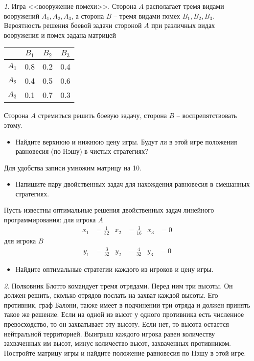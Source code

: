 \documentclass[12pt]{article}
\theoremstyle{remark}
\newtheorem{exercise}{}[subsection]
\begin{document}
\begin{exercise}
Игра <<вооружение помехи>>. Сторона $A$ располагает тремя видами вооружений
$A_1,A_2,A_3$, а сторона $B$ -- тремя видами помех $B_1,B_2,B_3$. Вероятность решения
боевой задачи стороной $A$ при различных видах вооружения и помех задана матрицей
\begin{center}
	\begin{tabular}{|c|c|c|c|}\hline
	& $B_1$ & $B_2$ & $B_3$ \\ \hline
	$A_1$ & 0.8 & 0.2 & 0.4 \\ \hline
	$A_2$ & 0.4 & 0.5 & 0.6 \\ \hline
	$A_3$ & 0.1 & 0.7 & 0.3 \\ \hline
	\end{tabular}
\end{center}
Сторона $A$ стремиться решить боевую задачу, сторона $B$ -- воспрепятствовать этому.
\begin{itemize}
	\item Найдите верхнюю и нижнюю цену игры. Будут ли в этой игре положения равновесия
	(по Нэшу) в чистых стратегиях?
\end{itemize}
Для удобства записи умножим матрицу на 10.
\begin{itemize}
	\item Напишите пару двойственных задач для нахождения равновесия в смешанных стратегиях.
\end{itemize}
Пусть известны оптимальные решения двойственных задач линейного программирования:
для игрока $A$
\begin{align*}
	x_1&=\frac{1}{32} & x_2&=\frac{3}{16} & x_3&=0
\end{align*}
для игрока $B$
\begin{align*}
	y_1&=\frac{3}{32} & y_2&=\frac{4}{32} & y_3&=0
\end{align*}
\begin{itemize}
	\item Найдите оптимальные стратегии каждого из игроков и цену игры.
\end{itemize}
\end{exercise}

\begin{exercise}
Полковник Блотто командует тремя отрядами. Перед ним три высоты.
Он должен решить, сколько отрядов послать на захват каждой высоты.
Его противник, граф Балони, также имеет в подчинении три отряда и должен принять такое же решение. 
Если на одной из высот у одного противника есть численное превосходство, то он захватывает эту высоту. 
Если нет, то высота остается нейтральной территорией. 
Выигрыш каждого игрока равен количеству захваченных им высот, 
минус количество высот, захваченных противником. 
Постройте матрицу игры и найдите положение равновесия по Нэшу в этой игре.
\end{exercise}
\end{document}
